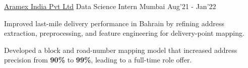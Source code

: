 \begin{cventries}
  \cventry
  {\href{https://www.aramex.com/in/en}{Aramex India Pvt Ltd}}
  {Data Science Intern}
  {Mumbai}
  {Aug'21 - Jan'22}
  {
    \begin{cvitems}
    \item Improved last-mile delivery performance in Bahrain by refining address extraction, preprocessing, and feature engineering for delivery-point mapping.
    \item Developed a block and road-number mapping model that increased address precision from \textbf{90\%} to \textbf{99\%}, leading to a full-time role offer.
    \end{cvitems}
  }

\end{cventries}
\vspace{-2mm}
